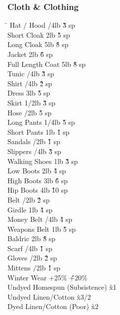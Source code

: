 \begin{multicols}{3}
{\subsubsection{Cloth \& Clothing}

\begin{tabbing}
\hspace{0.8\linewidth}\= \kill
Hat / Hood				/4lb		\' \` 3 sp \\
Short Cloak				\> 2lb			\' \` 5 sp \\
Long Cloak				\> 5lb			\' \` 8 sp \\
Jacket					\> 2lb			\' \` 6 sp \\
Full Length Coat			\> 5lb			\' \` 8 sp \\
Tunic					/4lb		\' \` 3 sp \\
Shirt					/4lb		\' \` 2 sp \\
Dress					\> 3lb			\' \` 5 sp \\
Skirt					 1/2lb		\' \` 3 sp \\
Hose					/2lb		\' \` 5 sp \\
Long Pants				 1/4lb		\' \` 5 sp \\
Short Pants				\> 1lb			\' \` 1 sp \\
Sandals					/2lb		\' \` 1 sp \\
Slippers				/4lb		\' \` 3 sp \\
Walking Shoes				\> 1lb			\' \` 3 sp \\
Low Boots				\> 2lb			\' \` 4 sp \\
High Boots				\> 3lb			\' \` 6 sp \\
Hip Boots				\> 4lb			\' \` 10 sp \\
Belt					/2lb		\' \` 2 sp \\
Girdle					\> 1lb			\' \` 4 sp \\
Money Belt				/4lb		\' \` 4 sp \\
Weapons Belt				\> 1lb			\' \` 5 sp \\
Baldric					\> 2lb			\' \` 8 sp \\
Scarf					/4lb		\' \` 1 sp \\
Gloves					/2lb		\' \` 2 sp \\
Mittens					/2lb		\' \` 1 sp \\
Winter Wear				\> +25\%		\' \` +20\% \\
Undyed Homespun (Subsistence)					\` x1 \\
Undyed Linen/Cotton						\` x3/2 \\
Dyed Linen/Cotton (Poor)					\` x2 \\

\end{tabbing}}
\end{multicols}
